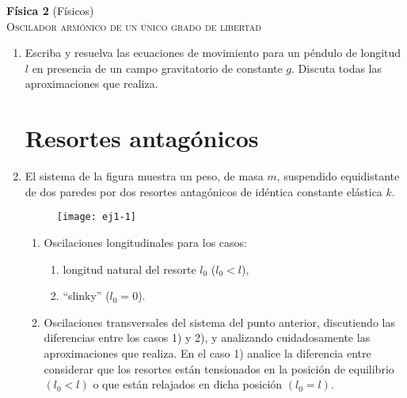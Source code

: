 \documentclass[11pt,spanish,a4paper]{article}
\begin{document}
\begin{center}
\textbf{Física 2} (Físicos) \hfill {}\\
	\textsc{\LARGE Oscilador armónico de un único grado de libertad}\\
\end{center}


\begin{enumerate}

\section*{Péndulo ideal}
\item Escriba y resuelva las ecuaciones de movimiento para un péndulo de longitud $l$ en presencia de un campo gravitatorio de constante $g$. Discuta todas las aproximaciones que realiza.



\section*{Resortes antagónicos}
\item El sistema de la figura muestra un peso, de masa $m$, suspendido equidistante de dos paredes por dos resortes antagónicos de idéntica constante elástica $k$.
\begin{figure}[H]
	\centering{}\texttt{[image: ej1-1]}
\end{figure}
\begin{enumerate}
	\item Oscilaciones longitudinales para los casos:   
	\begin{enumerate}
		\item longitud natural del resorte $l_0$ ($l_0<l$),   
		\item ``slinky'' ($l_0=0$).   
	\end{enumerate}
	\item Oscilaciones transversales del sistema del punto anterior, discutiendo las diferencias entre los casos 1) y 2), y analizando cuidadosamente las aproximaciones que realiza.
	En el caso 1) analice la diferencia entre considerar que los resortes están tensionados en la posición de equilibrio $(l_{0}<l)$ o que están relajados en dicha posición $(l_0= l)$.
\end{enumerate}


				
\end{enumerate}
\end{document}
